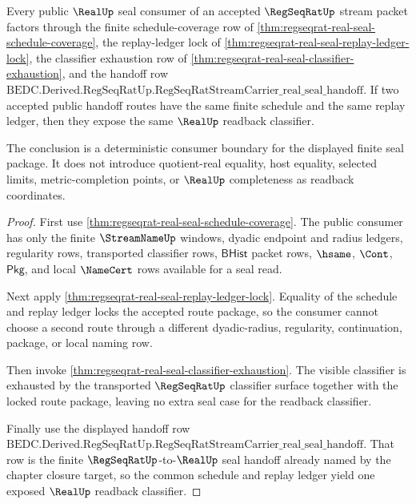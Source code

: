 \begin{theorem}
\label{thm:regseqrat-real-seal-public-handoff-determinacy}
Every public $\RealUp$ seal consumer of an accepted $\RegSeqRatUp$ stream
packet factors through the finite schedule-coverage row of
\autoref{thm:regseqrat-real-seal-schedule-coverage}, the replay-ledger lock of
\autoref{thm:regseqrat-real-seal-replay-ledger-lock}, the classifier
exhaustion row of \autoref{thm:regseqrat-real-seal-classifier-exhaustion},
and the handoff row
$\mathrm{BEDC.Derived.RegSeqRatUp.RegSeqRatStreamCarrier\_real\_seal\_handoff}$.
If two accepted public handoff routes have the same finite schedule and the
same replay ledger, then they expose the same $\RealUp$ readback classifier.

The conclusion is a deterministic consumer boundary for the displayed finite
seal package. It does not introduce quotient-real equality, host equality,
selected limits, metric-completion points, or $\RealUp$ completeness as
readback coordinates.
\end{theorem}
\begin{proof}
First use \autoref{thm:regseqrat-real-seal-schedule-coverage}. The public
consumer has only the finite $\StreamNameUp$ windows, dyadic endpoint and
radius ledgers, regularity rows, transported classifier rows, $\mathsf{BHist}$
packet rows, $\hsame$, $\Cont$, $\mathsf{Pkg}$, and local $\NameCert$ rows
available for a seal read.

Next apply \autoref{thm:regseqrat-real-seal-replay-ledger-lock}. Equality of
the schedule and replay ledger locks the accepted route package, so the
consumer cannot choose a second route through a different dyadic-radius,
regularity, continuation, package, or local naming row.

Then invoke \autoref{thm:regseqrat-real-seal-classifier-exhaustion}. The
visible classifier is exhausted by the transported $\RegSeqRatUp$ classifier
surface together with the locked route package, leaving no extra seal case for
the readback classifier.

Finally use the displayed handoff row
$\mathrm{BEDC.Derived.RegSeqRatUp.RegSeqRatStreamCarrier\_real\_seal\_handoff}$.
That row is the finite $\RegSeqRatUp$-to-$\RealUp$ seal handoff already named
by the chapter closure target, so the common schedule and replay ledger yield
one exposed $\RealUp$ readback classifier.
\end{proof}

